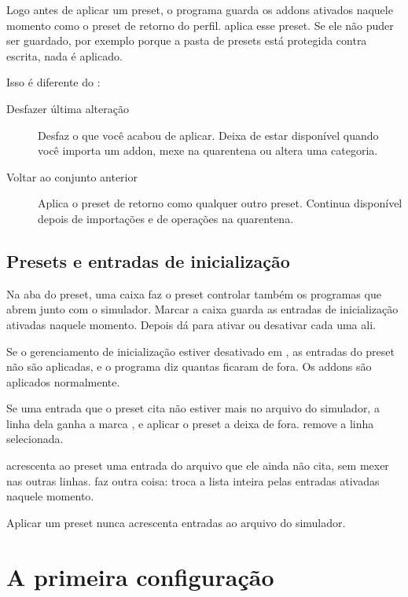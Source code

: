 \documentclass[11pt,a4paper]{article}
\begin{document}
Logo antes de aplicar um preset, o programa guarda os addons ativados naquele
momento como o preset de retorno do perfil. 
aplica esse preset. Se ele não puder ser guardado, por exemplo porque a pasta de
presets está protegida contra escrita, nada é aplicado.

Isso é diferente do :

\begin{description}
  \item[Desfazer última alteração] Desfaz o que você acabou de aplicar. Deixa de
    estar disponível quando você importa um addon, mexe na quarentena ou altera
    uma categoria.
  \item[Voltar ao conjunto anterior] Aplica o preset de retorno como qualquer
    outro preset. Continua disponível depois de importações e de operações na
    quarentena.
\end{description}

\subsection{Presets e entradas de inicialização}
\label{sec:presets-inicializacao}

Na aba  do preset, uma caixa faz o preset controlar também os
programas que abrem junto com o simulador. Marcar a caixa guarda as entradas
de inicialização ativadas naquele momento. Depois dá para ativar ou desativar
cada uma ali.

Se o gerenciamento de inicialização estiver desativado em , as
entradas do preset não são aplicadas, e o programa diz quantas ficaram de fora.
Os addons são aplicados normalmente.

Se uma entrada que o preset cita não estiver mais no arquivo do simulador, a
linha dela ganha a marca , e aplicar o preset a deixa de
fora.  remove a linha selecionada.

 acrescenta ao preset uma entrada do arquivo que ele ainda
não cita, sem mexer nas outras linhas. 
faz outra coisa: troca a lista inteira pelas entradas ativadas naquele momento.

Aplicar um preset nunca acrescenta entradas ao arquivo do simulador.

\section{A primeira configuração}
\end{document}
